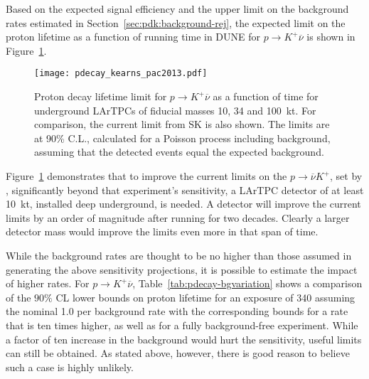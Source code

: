 Based on the expected signal efficiency and the upper limit on the
background rates estimated in Section~\ref{sec:pdk:background-rej}, 
the expected limit on the proton
lifetime as a function of running time in DUNE for $p \rightarrow K^+
\overline{\nu}$ is shown in 
Figure~\ref{fig:kdklimit}. 
\begin{figure}[!htb]
\centering
\texttt{[image: pdecay\_kearns\_pac2013.pdf]}
\caption[Proton decay lifetime limit for $p \rightarrow K^+ \overline{\nu}$
  versus time]{Proton decay lifetime limit for $p
  \rightarrow K^+ \overline{\nu}$ as a function of time for
  underground LArTPCs of fiducial masses 10, 34 and 100~kt.
  For comparison, the current limit from SK is also shown.
  The limits are at 90\% C.L., calculated for
  a Poisson process including background, assuming that the detected events
  equal the expected background.}
\label{fig:kdklimit}
\end{figure}
%
Figure~\ref{fig:kdklimit} demonstrates that 
to improve the current limits on
the $p \rightarrow \overline{\nu} K^+$, set by \superk, significantly
beyond that experiment's sensitivity, 
a LArTPC
detector of at least 10~kt, installed deep underground, is needed.
A  detector will improve the current limits by an order of
magnitude after running for two decades.  Clearly a larger detector
mass would improve the limits even more in that span of time.

While the background rates are thought to be no higher than those assumed 
in generating the above sensitivity projections, it is possible to estimate 
the impact of higher rates.  For $p\to K^+\overline{\nu}$, 
Table~\ref{tab:pdecay-bgvariation} shows a comparison of the 
$90\%$ CL lower bounds on proton lifetime for an exposure  of \SI{340}{\ktyr} 
assuming the nominal 1.0 per  \SI{}{\Mtyr} background rate with the 
corresponding bounds for a rate that is ten times higher, as well as for 
a fully background-free experiment.
%
%
While a factor of ten increase in the background would hurt the 
sensitivity, useful limits can still be obtained.  As stated 
above, however, there is good reason to believe such a case 
is highly unlikely.
%


